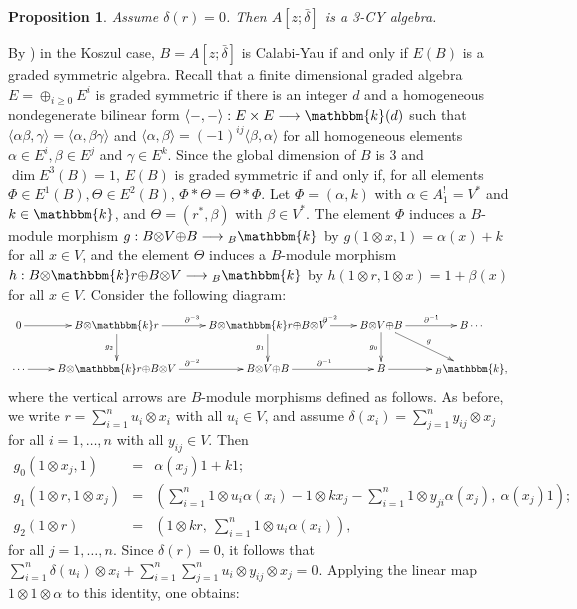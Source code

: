 \documentclass[a4paper]{amsart}
\newtheorem{prop}[thm]{Proposition}
\begin{document}
\begin{prop} \label{prop1} Assume $\delta(r)=0$. Then $A[z;\bar{\delta}]$ is a 3-CY algebra.
\end{prop}
\proof By \cite[Proposition 3.3]{HVZ1}) in the Koszul case, $B=A[z;\bar{\delta}]$ is Calabi-Yau if and only if $E(B)$ is a graded symmetric algebra. Recall that a finite dimensional graded algebra $E={\oplus}_{i\ge0}E^i$ is graded symmetric if there is an integer $d$ and a homogeneous
nondegenerate bilinear form $\langle-,-\rangle:E\times
E\longrightarrow {\mathbbm{k}}(d)$ such that $\langle \alpha\beta,\gamma\rangle=\langle
\alpha,\beta\gamma\rangle$ and $\langle \alpha,\beta\rangle=(-1)^{ij}\langle
\beta,\alpha\rangle$ for all homogeneous elements $\alpha\in E^i,\beta\in E^j$ and $\gamma\in E^k$. Since the global dimension of $B$ is 3 and $\dim E^3(B)=1$, $E(B)$ is graded symmetric if and only if, for all elements $\Phi\in E^1(B), \Theta\in E^2(B)$, $\Phi*\Theta=\Theta*\Phi$. Let $\Phi=(\alpha,k)$ with $\alpha\in A^!_1=V^*$ and $k\in{\mathbbm{k}}$, and $\Theta=(r^*,\beta)$ with $\beta\in V^*$. The element $\Phi$ induces a $B$-module morphism $g:B{\otimes} V{\oplus} B\longrightarrow {}_B{\mathbbm{k}}$ by $g(1{\otimes} x,1)=\alpha(x)+k$ for all $x\in V$, and the element $\Theta$ induces a $B$-module morphism $h:B{\otimes} {\mathbbm{k}} r{\oplus} B{\otimes} V\longrightarrow {}_B{\mathbbm{k}}$ by $h(1{\otimes} r,1{\otimes} x)=1+\beta(x)$ for all $x\in V$.
 Consider the following diagram:
$$\xymatrix{0\ar[r]&B{\otimes} {\mathbbm{k}} r\ar[r]^{\partial^{-3}}\ar[d]_{g_{2}} &B{\otimes} {\mathbbm{k}} r{\oplus} B{\otimes} V\ar[d]_{g_{1}}\ar[r]^{\quad\partial^{-2}}&B{\otimes} V{\oplus} B\ar[d]_{g_{0}}\ar[r]^{\quad\partial^{-1}}\ar[dr]^{g} &B\cdots\\
 \cdots\ar[r]&B{\otimes} {\mathbbm{k}} r{\oplus} B{\otimes} V\ar[r]^{\partial^{-2}} & B{\otimes} V{\oplus} B\ar[r]^{\partial^{-1}}& B\ar[r]&{}_B{\mathbbm{k}},
}$$
where the vertical arrows are $B$-module morphisms defined as follows. As before, we write $r=\sum_{i=1}^nu_i{\otimes} x_i$ with all $u_i\in V$, and assume $\delta(x_i)=\sum_{j=1}^n y_{ij}{\otimes} x_j$ for all $i=1,\dots,n$ with all $y_{ij}\in V$.
Then
{\small\begin{eqnarray}
\nonumber g_0(1{\otimes} x_j,1)&=&\alpha(x_j)1+k1;\\
\nonumber g_1(1{\otimes} r,1{\otimes} x_j)&=&\left(\sum_{i=1}^n1{\otimes} u_i\alpha(x_i)-1{\otimes} k x_j-\sum_{i=1}^n1{\otimes} y_{ji}\alpha(x_j),\ \alpha(x_j)1\right);\\
 \nonumber g_2(1{\otimes} r)&=&(1{\otimes} k r,\ \sum_{i=1}^n1{\otimes} u_i\alpha (x_i)),
\end{eqnarray}} for all $j=1,\dots,n$. Since $\delta(r)=0$, it follows that $\displaystyle\sum_{i=1}^n\delta(u_i) {\otimes} x_i+\sum_{i=1}^n\sum_{j=1}^n u_i{\otimes} y_{ij}{\otimes} x_j=0$. Applying the linear map $1{\otimes} 1{\otimes} \alpha$ to this identity, one obtains:
\end{document}
